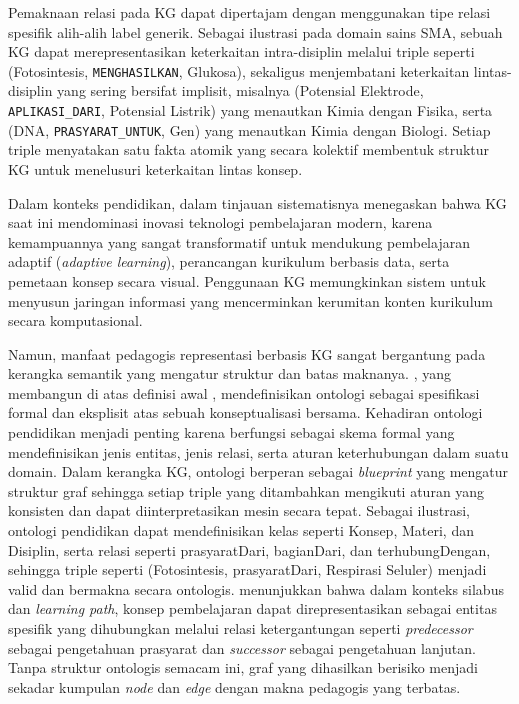 \documentclass[../../thesis]{subfiles}
\begin{document}
Pemaknaan relasi pada KG dapat dipertajam dengan menggunakan tipe relasi
spesifik alih-alih label generik. Sebagai ilustrasi pada domain sains SMA,
sebuah KG dapat merepresentasikan keterkaitan intra-disiplin melalui triple
seperti (Fotosintesis, \texttt{MENGHASILKAN}, Glukosa), sekaligus menjembatani
keterkaitan lintas-disiplin yang sering bersifat implisit, misalnya
(Potensial Elektrode, \texttt{APLIKASI\_DARI}, Potensial Listrik) yang menautkan
Kimia dengan Fisika, serta (DNA, \texttt{PRASYARAT\_UNTUK}, Gen) yang menautkan
Kimia dengan Biologi. Setiap triple menyatakan satu fakta atomik yang secara
kolektif membentuk struktur KG untuk menelusuri keterkaitan lintas konsep.

Dalam konteks pendidikan, \textcite{abu-salih_systematic_2024} dalam tinjauan
sistematisnya menegaskan bahwa KG saat ini mendominasi inovasi teknologi
pembelajaran modern, karena kemampuannya yang sangat transformatif untuk
mendukung pembelajaran adaptif (\textit{adaptive learning}), perancangan
kurikulum berbasis data, serta pemetaan konsep secara visual. Penggunaan
KG memungkinkan sistem untuk menyusun jaringan informasi yang
mencerminkan kerumitan konten kurikulum secara komputasional.

Namun, manfaat pedagogis representasi berbasis KG sangat bergantung pada
kerangka semantik yang mengatur struktur dan batas maknanya. \textcite{studer_knowledge_1998}, yang membangun
di atas definisi awal \textcite{gruber_translation_1993}, mendefinisikan ontologi sebagai
spesifikasi formal dan eksplisit atas sebuah konseptualisasi bersama.
Kehadiran ontologi pendidikan menjadi penting
karena berfungsi sebagai skema formal yang mendefinisikan jenis entitas,
jenis relasi, serta aturan keterhubungan dalam suatu
domain. Dalam kerangka KG, ontologi berperan sebagai
\textit{blueprint} yang mengatur struktur graf sehingga setiap triple
yang ditambahkan mengikuti aturan yang konsisten dan dapat
diinterpretasikan mesin secara tepat. Sebagai ilustrasi, ontologi
pendidikan dapat mendefinisikan kelas seperti Konsep, Materi, dan
Disiplin, serta relasi seperti prasyaratDari, bagianDari, dan
terhubungDengan, sehingga triple seperti (Fotosintesis, prasyaratDari,
Respirasi Seluler) menjadi valid dan bermakna secara ontologis.
\textcite{zhang_learning_2023} menunjukkan bahwa dalam konteks silabus dan
\textit{learning path}, konsep pembelajaran dapat direpresentasikan
sebagai entitas spesifik yang dihubungkan melalui relasi ketergantungan
seperti \textit{predecessor} sebagai pengetahuan prasyarat dan
\textit{successor} sebagai pengetahuan lanjutan. Tanpa struktur
ontologis semacam ini, graf yang dihasilkan berisiko menjadi sekadar
kumpulan \textit{node} dan \textit{edge} dengan makna pedagogis yang terbatas.
\end{document}
